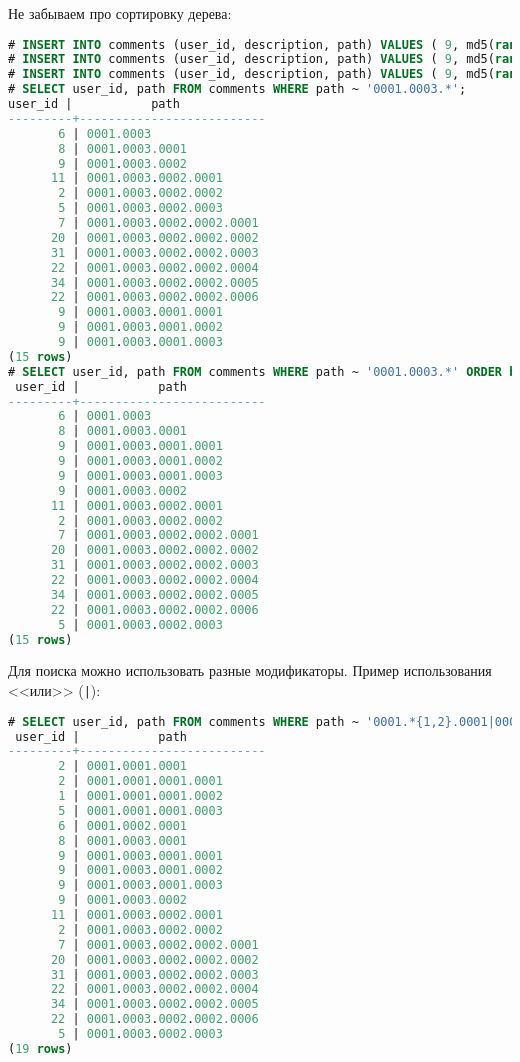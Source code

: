 Не забываем про сортировку дерева:

\begin{lstlisting}[language=SQL,label=lst:pgltree7,caption=Ltree]
# INSERT INTO comments (user_id, description, path) VALUES ( 9, md5(random()::text), '0001.0003.0001.0001');
# INSERT INTO comments (user_id, description, path) VALUES ( 9, md5(random()::text), '0001.0003.0001.0002');
# INSERT INTO comments (user_id, description, path) VALUES ( 9, md5(random()::text), '0001.0003.0001.0003');
# SELECT user_id, path FROM comments WHERE path ~ '0001.0003.*';
user_id |           path
---------+--------------------------
       6 | 0001.0003
       8 | 0001.0003.0001
       9 | 0001.0003.0002
      11 | 0001.0003.0002.0001
       2 | 0001.0003.0002.0002
       5 | 0001.0003.0002.0003
       7 | 0001.0003.0002.0002.0001
      20 | 0001.0003.0002.0002.0002
      31 | 0001.0003.0002.0002.0003
      22 | 0001.0003.0002.0002.0004
      34 | 0001.0003.0002.0002.0005
      22 | 0001.0003.0002.0002.0006
       9 | 0001.0003.0001.0001
       9 | 0001.0003.0001.0002
       9 | 0001.0003.0001.0003
(15 rows)
# SELECT user_id, path FROM comments WHERE path ~ '0001.0003.*' ORDER by path;
 user_id |           path
---------+--------------------------
       6 | 0001.0003
       8 | 0001.0003.0001
       9 | 0001.0003.0001.0001
       9 | 0001.0003.0001.0002
       9 | 0001.0003.0001.0003
       9 | 0001.0003.0002
      11 | 0001.0003.0002.0001
       2 | 0001.0003.0002.0002
       7 | 0001.0003.0002.0002.0001
      20 | 0001.0003.0002.0002.0002
      31 | 0001.0003.0002.0002.0003
      22 | 0001.0003.0002.0002.0004
      34 | 0001.0003.0002.0002.0005
      22 | 0001.0003.0002.0002.0006
       5 | 0001.0003.0002.0003
(15 rows)
\end{lstlisting}

Для поиска можно использовать разные модификаторы. Пример использования <<или>> (\lstinline!|!):

\begin{lstlisting}[language=SQL,label=lst:pgltree8,caption=Ltree]
# SELECT user_id, path FROM comments WHERE path ~ '0001.*{1,2}.0001|0002.*' ORDER by path;
 user_id |           path
---------+--------------------------
       2 | 0001.0001.0001
       2 | 0001.0001.0001.0001
       1 | 0001.0001.0001.0002
       5 | 0001.0001.0001.0003
       6 | 0001.0002.0001
       8 | 0001.0003.0001
       9 | 0001.0003.0001.0001
       9 | 0001.0003.0001.0002
       9 | 0001.0003.0001.0003
       9 | 0001.0003.0002
      11 | 0001.0003.0002.0001
       2 | 0001.0003.0002.0002
       7 | 0001.0003.0002.0002.0001
      20 | 0001.0003.0002.0002.0002
      31 | 0001.0003.0002.0002.0003
      22 | 0001.0003.0002.0002.0004
      34 | 0001.0003.0002.0002.0005
      22 | 0001.0003.0002.0002.0006
       5 | 0001.0003.0002.0003
(19 rows)
\end{lstlisting}

